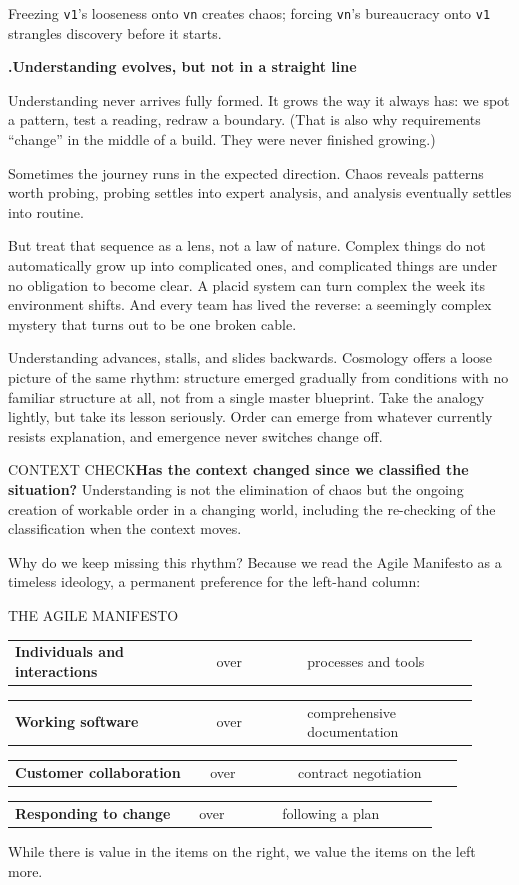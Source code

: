 \documentclass[10pt,a4paper]{article}
\makeatletter
\newcounter{movement}
\newcounter{sub}[movement]
\renewcommand{\thesub}{\arabic{movement}.\arabic{sub}}
\newcommand{\code}[1]{\texttt{#1}}
\newcommand{\Checkpoint}[2]{\begin{checkbox}{#1}#2\end{checkbox}}
\newcommand{\SubHead}[1]{%
  \par\Needspace{5\baselineskip}\stepcounter{sub}\vspace{2mm}%
  {\ttfamily\bfseries\footnotesize\textcolor{G2}{\thesub}\enspace\sffamily\bfseries\normalsize #1\par}%
  \vspace{0.6mm}%
}
\newcommand{\Pair}[3]{%
  \par\noindent
  \begin{tabular}{@{}p{0.40\linewidth}@{\hspace{2mm}}p{0.18\linewidth}@{\hspace{2mm}}p{0.34\linewidth}@{}}
    \sffamily\bfseries #1 & \ttfamily\scriptsize\textcolor{G2}{#2} & \sffamily #3
  \end{tabular}\par
  \vspace{1.4mm}%
}
\makeatother
\begin{document}
Freezing \code{v1}'s looseness onto \code{vn} creates chaos; forcing \code{vn}'s bureaucracy onto \code{v1} strangles discovery before it starts.

\SubHead{Understanding evolves, but not in a straight line}

Understanding never arrives fully formed. It grows the way it always has: we spot a pattern, test a reading, redraw a boundary. (That is also why requirements “change” in the middle of a build. They were never finished growing.)

Sometimes the journey runs in the expected direction. Chaos reveals patterns worth probing, probing settles into expert analysis, and analysis eventually settles into routine.

But treat that sequence as a lens, not a law of nature. Complex things do not automatically grow up into complicated ones, and complicated things are under no obligation to become clear. A placid system can turn complex the week its environment shifts. And every team has lived the reverse: a seemingly complex mystery that turns out to be one broken cable.

Understanding advances, stalls, and slides backwards. Cosmology offers a loose picture of the same rhythm: structure emerged gradually from conditions with no familiar structure at all, not from a single master blueprint. Take the analogy lightly, but take its lesson seriously. Order can emerge from whatever currently resists explanation, and emergence never switches change off.

\Checkpoint{CONTEXT CHECK}{\textbf{Has the context changed since we classified the situation?} Understanding is not the elimination of chaos but the ongoing creation of workable order in a changing world, including the re-checking of the classification when the context moves.}

Why do we keep missing this rhythm? Because we read the Agile Manifesto \cite{beck01} as a timeless ideology, a permanent preference for the left-hand column:

\begin{manifesto}{THE AGILE MANIFESTO}
\Pair{Individuals and interactions}{over}{processes and tools}
\Pair{Working software}{over}{comprehensive documentation}
\Pair{Customer collaboration}{over}{contract negotiation}
\Pair{Responding to change}{over}{following a plan}
{\small\sffamily\color{G2}While there is value in the items on the right, we value the items on the left more.}
\end{manifesto}
\end{document}
